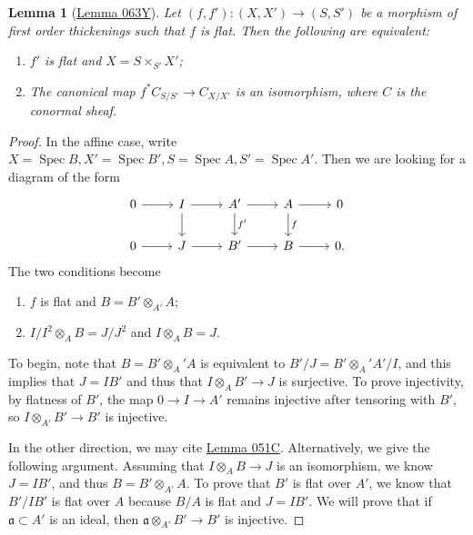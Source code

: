 \documentclass[leqno, openany]{memoir}
\newtheorem{lem}[thm]{Lemma}
\theoremstyle{definition}
\theoremstyle{remark}
\theoremstyle{plain}
\theoremstyle{definition}
\theoremstyle{remark}
\newcommand{\mf}[1]{\mathfrak{#1}}
\DeclareMathOperator{\Spec}{Spec}
\begin{document}
\begin{lem}[\href{https://stacks.math.columbia.edu/tag/063Y}{Lemma 063Y}]
    Let $(f, f') \colon (X, X') \to (S, S')$ be a morphism of first order thickenings such that $f$ is flat. Then the following are equivalent:
    \begin{enumerate}
        \item $f'$ is flat and $X = S \times_{S'} X'$;
        \item The canonical map $f^* C_{S/S'} \to C_{X/X'}$ is an isomorphism, where $C$ is the conormal sheaf.
    \end{enumerate}
\end{lem}

\begin{proof}
    In the affine case, write $X = \Spec B, X' = \Spec B', S = \Spec A, S' = \Spec A'$. Then we are looking for a diagram of the form
    \begin{equation*}
    \begin{tikzcd}
        0 \ar{r} & I \ar{r} \ar{d} & A' \ar{d}{f'} \ar{r} & A \ar{r} \ar{d}{f} & 0 \\
        0 \ar{r} & J \ar{r} & B' \ar{r} & B \ar{r} & 0.
    \end{tikzcd}
    \end{equation*}
    The two conditions become
    \begin{enumerate}
        \item $f$ is flat and $B = B' \otimes_{A'} A$;
        \item $I/I^2 \otimes_A B = J /J^2$ and $I \otimes_A B = J$.
    \end{enumerate}
    To begin, note that $B = B' \otimes_A' A$ is equivalent to $B' / J = B' \otimes_A' A'/I$, and this implies that $J = IB'$ and thus that $I \otimes_A B' \to J$ is surjective. To prove injectivity, by flatness of $B'$, the map $0 \to I \to A'$ remains injective after tensoring with $B'$, so $I \otimes_{A'} B' \to B'$ is injective.

    In the other direction, we may cite \href{https://stacks.math.columbia.edu/tag/051C}{Lemma 051C}. Alternatively, we give the following argument. Assuming that $I \otimes_A B \to J$ is an isomorphism, we know $J = IB'$, and thus $B = B' \otimes_{A'} A$. To prove that $B'$ is flat over $A'$, we know that $B'/IB'$ is flat over $A$ because $B/A$ is flat and $J = IB'$. We will prove that if $\mf{a} \subset A'$ is an ideal, then $\mf{a} \otimes_{A'} B' \to B'$ is injective.


\end{proof}
\end{document}

